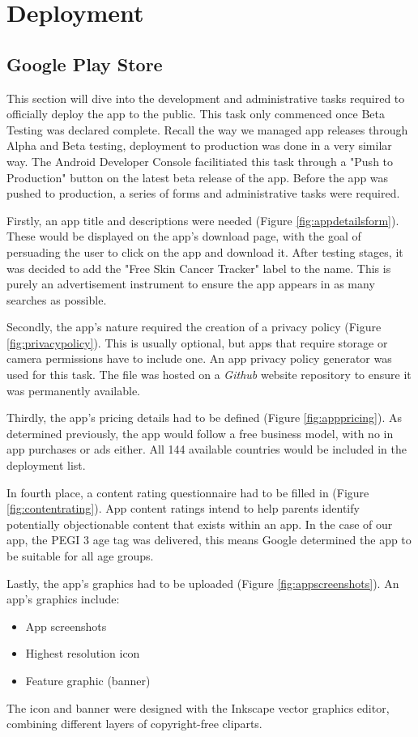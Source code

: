 \chapter{Deployment}
\section{Google Play Store}
This section will dive into the development and administrative tasks required to officially deploy the app to the public. This task only commenced once Beta Testing was declared complete. Recall the way we managed app releases through Alpha and Beta testing, deployment to production was done in a very similar way. The Android Developer Console facilitiated this task through a "Push to Production" button on the latest beta release of the app.
Before the app was pushed to production, a series of forms and administrative tasks were required. 

Firstly, an app title and descriptions were needed (Figure \ref{fig:appdetailsform}). These would be displayed on the app's download page, with the goal of persuading the user to click on the app and download it. After testing stages, it was decided to add the "Free Skin Cancer Tracker" label to the name. This is purely an advertisement instrument to ensure the app appears in as many searches as possible.

Secondly, the app's nature required the creation of a privacy policy (Figure \ref{fig:privacypolicy}). This is usually optional, but apps that require storage or camera permissions have to include one. An app privacy policy generator \cite{nishantsrivastava} was used for this task. The file was hosted on a \emph{Github} website repository to ensure it was permanently available.

Thirdly, the app's pricing details had to be defined (Figure \ref{fig:apppricing}). As determined previously, the app would follow a free business model, with no in app purchases or ads either. All 144 available countries would be included in the deployment list.

In fourth place, a content rating questionnaire had to be filled in (Figure \ref{fig:contentrating}). App content ratings intend to help parents identify potentially objectionable content that exists within an app. In the case of our app, the PEGI 3 age tag was delivered, this means Google determined the app to be suitable for all age groups.

Lastly, the app's graphics had to be uploaded (Figure \ref{fig:appscreenshots}). An app's graphics include:
\begin{itemize}
    \item App screenshots
    \item Highest resolution icon
    \item Feature graphic (banner)
\end{itemize}
The icon and banner were designed with the Inkscape vector graphics editor, combining different layers of copyright-free cliparts.

